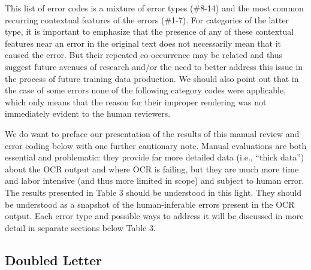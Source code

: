 This list of error codes is a mixture of error types (\#8-14) and the most
common recurring contextual features of the errors (\#1-7). For categories of
the latter type, it is important to emphasize that the presence of any of these
contextual features near an error in the original text does not necessarily
mean that it caused the error. But their repeated co-occurrence may be related
and thus suggest future avenues of research and/or the need to better address
this issue in the process of future training data production. We should also
point out that in the case of some errors none of the following category codes
were applicable, which only means that the reason for their improper rendering
was not immediately evident to the human reviewers. 

We do want to preface our presentation of the results of this manual review and
error coding below with one further cautionary note. Manual evaluations are
both essential and problematic: they provide far more detailed data (i.e.,
“thick data”) about the OCR output and where OCR is failing, but they are much
more time and labor intensive (and thus more limited in scope) and subject to
human error. The results presented in Table 3 should be understood in this
light. They should be understood as a snapshot of the human-inferable errors
present in the OCR output. Each error type and possible ways to address it will
be discussed in more detail in separate sections below Table 3.

	



\subsection{Doubled Letter}

